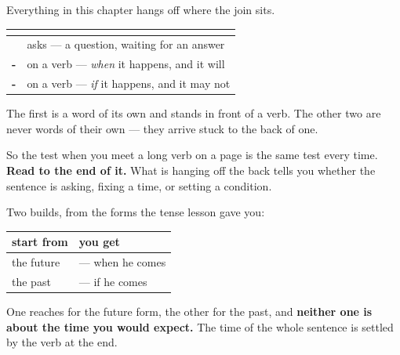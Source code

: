 \begin{grammarlens}[title={Grammar Lens: one piece, three jobs}]
Everything in this chapter hangs off where the join sits.

\noindent
\begin{tabularx}{\linewidth}{@{}>{\raggedright\arraybackslash}X>{\raggedright\arraybackslash}X@{}}
\toprule
\textbf{} & \textbf{} \\
\midrule
\textbf{\ml{എപ്പോൾ}} & asks — a question, waiting for an answer \\
\textbf{-\ml{ുമ്പോൾ}} & on a verb — \emph{when} it happens, and it will \\
\textbf{-\ml{ആൽ}} & on a verb — \emph{if} it happens, and it may not \\
\bottomrule
\end{tabularx}

The first is a word of its own and stands in front of a verb. The other two are never words of their own — they arrive stuck to the back of one.

So the test when you meet a long verb on a page is the same test every time. \textbf{Read to the end of it.} What is hanging off the back tells you whether the sentence is asking, fixing a time, or setting a condition.
\end{grammarlens}

\begin{grammarlens}[title={What you've built}]
Two builds, from the forms the tense lesson gave you:

\noindent
\begin{tabularx}{\linewidth}{@{}>{\raggedright\arraybackslash}X>{\raggedright\arraybackslash}X@{}}
\toprule
\textbf{start from} & \textbf{you get} \\
\midrule
the future \textbf{\ml{വരും}} & \textbf{\ml{വരുമ്പോൾ}} — when he comes \\
the past \textbf{\ml{വന്നു}} & \textbf{\ml{വന്നാൽ}} — if he comes \\
\bottomrule
\end{tabularx}

One reaches for the future form, the other for the past, and \textbf{neither one is about the time you would expect.} The time of the whole sentence is settled by the verb at the end.
\end{grammarlens}

